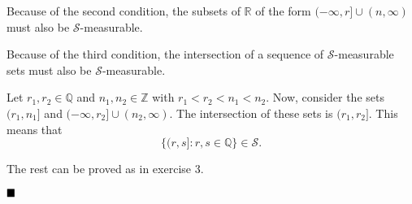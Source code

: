\documentclass[11pt, a4paper, tikz]{article}
\renewcommand{\qed}{\hfill\blacksquare}
\newcommand{\integers}{
	\ensuremath{\mathbb{Z}}
}
\newcommand{\rationals}{
	\ensuremath{\mathbb{Q}}
}
\newcommand{\reals}{
	\ensuremath{\mathbb{R}}
}
\newcommand{\sigmaAlgebra}[1]{
	\ensuremath{\mathcal{#1}}
}
\begin{document}
	Because of the second condition, the subsets of $\reals$ of the form $(-\infty, r]\cup(n, \infty)$ must also be $\sigmaAlgebra{S}$-measurable.
	
	Because of the third condition, the intersection of a sequence of $\sigmaAlgebra{S}$-measurable sets must also be $\sigmaAlgebra{S}$-measurable.
	
	Let $r_1, r_2\in\rationals$ and $n_1, n_2\in\integers$ with $r_1 < r_2 < n_1 < n_2$. Now, consider the sets $(r_1, n_1]$ and $(-\infty, r_2]\cup(n_2, \infty)$. The intersection of these sets is $(r_1, r_2]$. This means that \[\{(r,s]:r,s\in\rationals\}\in\sigmaAlgebra{S}.\]
	
	The rest can be proved as in exercise 3.
	
	$\qed$
\end{document}
